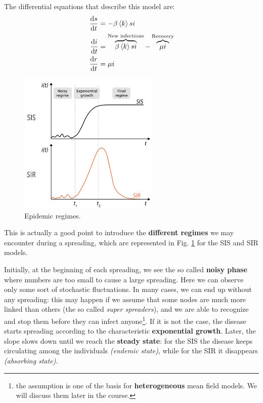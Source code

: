 \documentclass[../main/main.tex]{subfiles}
\begin{document}
The differential equations that describe this model are:
\begin{equation}
\begin{split}
  \dv{s}{t} &= - \beta \expval{k} si  \\
  \dv{i}{t} &= \overbrace{\beta \expval{k} si}^{\text{New infections}}  - \overbrace{\mu i}^{\text{Recovery}} \\
  \dv{r}{t} &= \mu i
\end{split}
\end{equation}

\begin{figure}[h!]
\centering
\includegraphics[width=0.6\textwidth]{../lessons/image/03/6.png}
\caption{\label{fig:3_6} Epidemic regimes.}
\end{figure}

This is actually a good point to introduce the \textbf{different regimes} we may encounter during a spreading, which are represented in Fig. \ref{fig:3_6} for the SIS and SIR models.

Initially, at the beginning of each spreading, we see the so called \textbf{noisy phase} where numbers are too small to cause a large spreading. Here we can observe only some sort of stochastic fluctuations. In many cases, we can end up without any spreading: this may happen if we assume that some nodes are much more linked than others (the so called \textit{super spreaders}), and we are able to recognize and stop them before they can infect anyone\footnote{the assumption is one of the basis for \textbf{heterogeneous} mean field models. We will discuss them later in the course.}. If it is not the case, the disease starts spreading according to the characteristic \textbf{exponential growth}. Later, the slope slows down until we reach the \textbf{steady state}: for the SIS the disease keeps circulating among the individuals \textit{(endemic state)}, while for the SIR it disappears \textit{(absorbing state)}.
\end{document}
